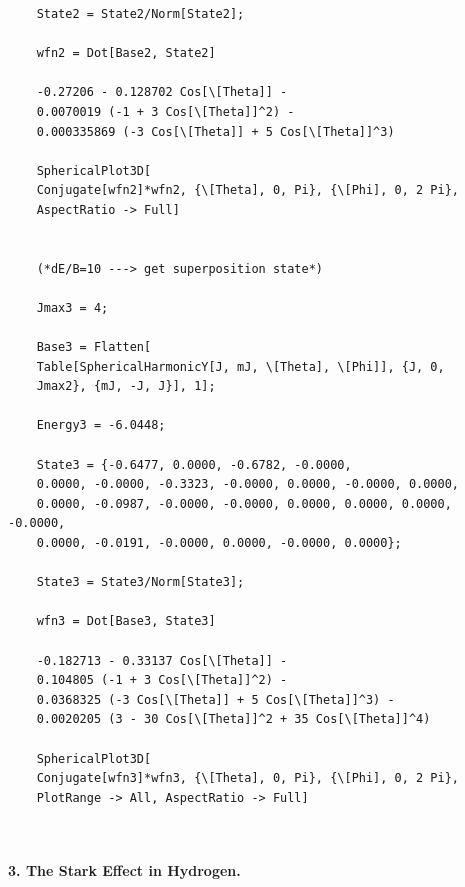\documentclass{article}
\theoremstyle{definition}
\begin{document}
\begin{enumerate}[label=(\alph*)]
\begin{lstlisting}
	State2 = State2/Norm[State2];
	
	wfn2 = Dot[Base2, State2]
	
	-0.27206 - 0.128702 Cos[\[Theta]] - 
	0.0070019 (-1 + 3 Cos[\[Theta]]^2) - 
	0.000335869 (-3 Cos[\[Theta]] + 5 Cos[\[Theta]]^3)
	
	SphericalPlot3D[
	Conjugate[wfn2]*wfn2, {\[Theta], 0, Pi}, {\[Phi], 0, 2 Pi}, 
	AspectRatio -> Full]
	
	
	(*dE/B=10 ---> get superposition state*)
	
	Jmax3 = 4;
	
	Base3 = Flatten[
	Table[SphericalHarmonicY[J, mJ, \[Theta], \[Phi]], {J, 0, 
	Jmax2}, {mJ, -J, J}], 1];
	
	Energy3 = -6.0448;
	
	State3 = {-0.6477, 0.0000, -0.6782, -0.0000, 
	0.0000, -0.0000, -0.3323, -0.0000, 0.0000, -0.0000, 0.0000, 
	0.0000, -0.0987, -0.0000, -0.0000, 0.0000, 0.0000, 0.0000, -0.0000,
	0.0000, -0.0191, -0.0000, 0.0000, -0.0000, 0.0000};
	
	State3 = State3/Norm[State3];
	
	wfn3 = Dot[Base3, State3]
	
	-0.182713 - 0.33137 Cos[\[Theta]] - 
	0.104805 (-1 + 3 Cos[\[Theta]]^2) - 
	0.0368325 (-3 Cos[\[Theta]] + 5 Cos[\[Theta]]^3) - 
	0.0020205 (3 - 30 Cos[\[Theta]]^2 + 35 Cos[\[Theta]]^4)
	
	SphericalPlot3D[
	Conjugate[wfn3]*wfn3, {\[Theta], 0, Pi}, {\[Phi], 0, 2 Pi}, 
	PlotRange -> All, AspectRatio -> Full]
	
	
	\end{lstlisting}

	
\end{enumerate}

\noindent \textbf{3. The Stark Effect in Hydrogen.}
\end{document}
